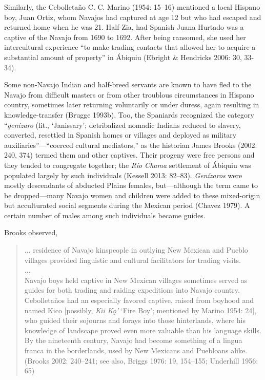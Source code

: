Similarly, the Cebolletaño C. C. Marino (1954: 15–16) mentioned a local Hispano boy, Juan Ortiz, whom Navajos had captured at age 12 but who had escaped and returned home when he was 21.  Half-Zia, had Spanish Juana Hurtado was a captive of the Navajo from 1690 to 1692.  After being ransomed, she used her intercultural experience “to make trading contacts that allowed her to acquire a substantial amount of property” in Ábiquiu (Ebright \& Hendricks 2006: 30, 33-34).

Some non-Navajo Indian and half-breed servants are known to have fled to the Navajo from difficult masters or from other troublous circumstances in Hispano country, sometimes later returning voluntarily or under duress, again resulting in knowledge-transfer (Brugge 1993b).  Too, the Spaniards recognized the category “\textit{genízaro }(lit., ‘Janissary’; detribalized nomadic Indians reduced to slavery, converted, resettled in Spanish homes or villages and deployed as military auxiliaries”—“coerced cultural mediators,” as the historian James Brooks (2002: 240, 374) termed them and other captives.  Their progeny were free persons and they tended to congregate together; the \textit{Río Chama} settlement of Ábiquiu was populated largely by such individuals (Kessell 2013: 82–83).  \textit{Genízaros} were mostly descendants of abducted Plains females, but—although the term came to be dropped—many Navajo women and children were added to these mixed-origin but acculturated social segments during the Mexican period (Chavez 1979).  A certain number of males among such individuals became guides.

Brooks observed,

\begin{quote}

... residence of Navajo kinspeople in outlying New Mexican and Pueblo villages provided linguistic and cultural facilitators for trading visits.\\
...\\
Navajo boys held captive in New Mexican villages sometimes served as guides for both trading and raiding expeditions into Navajo country.  Cebolletaños had an especially favored captive, raised from boyhood and named Kico [possibly, \textit{Kii Kǫ’} ‘Fire Boy’; mentioned by Marino 1954: 24], who guided their sojourns and forays into those hinterlands, where his knowledge of landscape proved even more valuable than his language skills.  By the nineteenth century, Navajo had become something of a lingua franca in the borderlands, used by New Mexicans and Puebloans alike.  (Brooks 2002: 240–241; see also, Briggs 1976: 19, 154–155; Underhill 1956: 65)
\end{quote}
